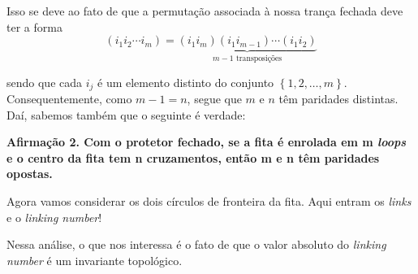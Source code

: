 	\par\vspace{0.3cm} Isso se deve ao fato de que a permutação associada à nossa trança fechada deve ter a forma
	\begin{equation*}
	    (i_1i_2\cdots i_m) = \underbrace{(i_1i_m)(i_1i_{m-1})\cdots(i_1i_2)}_{m-1\text{ transposições}}
	\end{equation*}
	\par\vspace{0.3cm} sendo que cada $i_j$ é um elemento distinto do conjunto $\left\{1, 2, \dots, m \right\}$.
	Consequentemente, como $m-1=n$, segue que $m$ e $n$ têm paridades distintas. Daí, sabemos também que o 
	seguinte é verdade:
	\begin{center}
		\textbf{Afirmação 2. Com o protetor fechado, se a fita é enrolada em m \textit{loops} e o centro 
		da fita tem n cruzamentos, então m e n têm paridades opostas.}
	\end{center}
	\par\vspace{0.3cm} Agora vamos considerar os dois círculos de fronteira da fita. Aqui entram os 
	\textit{links} e o \textit{linking number}!
	
	\par\vspace{0.3cm} Nessa análise, o que nos interessa é o fato de que o valor absoluto do 
	\textit{linking number} é um invariante topológico.
	
